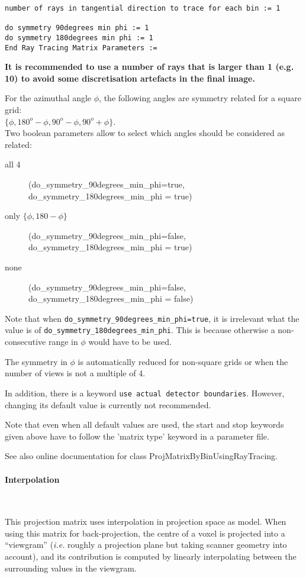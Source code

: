 \documentclass{article}
\newcommand{\subsubsubsection}[1]{\paragraph{#1}\mbox{} \\}
\begin{document}
{{\begin{verbatim}
number of rays in tangential direction to trace for each bin := 1

do symmetry 90degrees min phi := 1 
do symmetry 180degrees min phi := 1
End Ray Tracing Matrix Parameters :=
\end{verbatim}

\textbf{It is recommended to use a number of rays that is larger than 1 (e.g. 10) to
avoid some discretisation artefacts in the final image.}

For the azimuthal angle $\phi$, the following angles are symmetry 
related for a square grid: \\
$\{\phi, 180^{o}-\phi, 90^{o}-\phi, 90^{o}+\phi\}$.\\
Two boolean parameters allow to select which angles should be 
considered as related:
\begin{description}
\item[all 4]
  (do\_symmetry\_90degrees\_min\_phi=true,  \\
do\_symmetry\_180degrees\_min\_phi = true)
\item[only $\{ \phi, 180- \phi \}$]
(do\_symmetry\_90degrees\_min\_phi=false,  \\
do\_symmetry\_180degrees\_min\_phi = true)
\item[none]
(do\_symmetry\_90degrees\_min\_phi=false, \\
do\_symmetry\_180degrees\_min\_phi = false)
\end{description}

Note that when \texttt{do\_symmetry\_90degrees\_min\_phi=true}, 
it is irrelevant what the value is 
of \texttt{do\_symmetry\_180degrees\_min\_phi}. This is because 
otherwise a non-consecutive range in $\phi$ would have to be used.


The symmetry in $\phi$ is automatically reduced for non-square grids 
or when the number of views is not a multiple of 4.



In addition, there is a keyword \texttt{use actual detector boundaries}. 
However, changing its default value is currently not recommended. 




Note that even when all default values are used, the start and 
stop keywords given above have to follow the 'matrix type' keyword 
in a parameter file.


See also online documentation for class ProjMatrixByBinUsingRayTracing. 


{ \subsubsubsection{Interpolation}
}
\label{sec:projmatrixusinginterpolation}
This projection matrix uses interpolation in projection space as model. 
When using this matrix for back-projection, the centre of a voxel is projected 
into a ``viewgram'' (\textit{i.e.} roughly a projection plane but taking scanner 
geometry into account), and its contribution is computed by linearly interpolating
between the surrounding values in the viewgram.

}}
\end{document}
